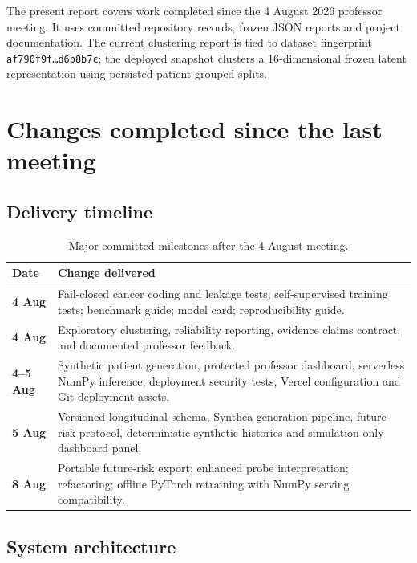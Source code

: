 \documentclass[11pt,a4paper]{article}
\newcommand{\code}[1]{\texttt{\small #1}}
\begin{document}
The present report covers work completed since the 4 August 2026 professor
meeting. It uses committed repository records, frozen JSON reports and project
documentation. The current clustering report is tied to dataset fingerprint
\code{af790f9f\ldots d6b8b7c}; the deployed snapshot clusters a 16-dimensional
frozen latent representation using persisted patient-grouped splits.

\section{Changes completed since the last meeting}

\subsection{Delivery timeline}

\begin{table}[H]
\centering
\small
\caption{Major committed milestones after the 4 August meeting.}
\begin{tabularx}{\textwidth}{>{\bfseries}p{18mm} X}
\toprule
Date & Change delivered \\
\midrule
4 Aug & Fail-closed cancer coding and leakage tests; self-supervised training
tests; benchmark guide; model card; reproducibility guide. \\
4 Aug & Exploratory clustering, reliability reporting, evidence claims contract,
and documented professor feedback. \\
4--5 Aug & Synthetic patient generation, protected professor dashboard, serverless
NumPy inference, deployment security tests, Vercel configuration and Git deployment assets. \\
5 Aug & Versioned longitudinal schema, Synthea generation pipeline, future-risk
protocol, deterministic synthetic histories and simulation-only dashboard panel. \\
8 Aug & Portable future-risk export; enhanced probe interpretation; refactoring;
offline PyTorch retraining with NumPy serving compatibility. \\
\bottomrule
\end{tabularx}
\end{table}

\subsection{System architecture}
\end{document}
